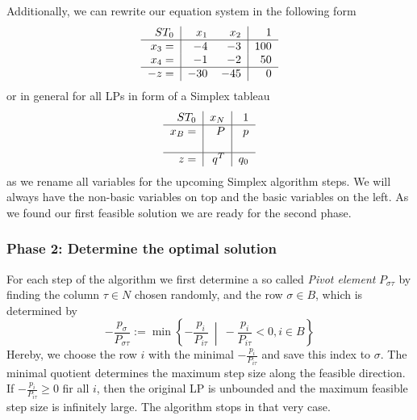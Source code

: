 \documentclass[a4paper, 11pt]{article}
\begin{document}
Additionally, we can rewrite our equation system in the following form
\begin{equation*}
	\begin{tabular}{r|rr|r}
		$ST_0$&$x_1$&$x_2$&$1$\\
		\hline
		$x_3=$&$-4$&$-3$&$100$\\
		$x_4=$&$-1$&$-2$&$50$\\
		\hline
		$-z=$&$-30$&$-45$&$0$
	\end{tabular}
\end{equation*}
or in general for all LPs in form of a Simplex tableau
\begin{equation}
	\begin{tabular}{r|r|r}
		$ST_0$&$x_N$&$1$\\
		\hline
		$x_B=$&$P$&$p$\\
		&&\\
		\hline
		$z=$&$q^T$&$q_0$
	\end{tabular}
\end{equation}
as we rename all variables for the upcoming Simplex algorithm steps. We will always have the non-basic variables on top and the basic variables on the left. As we found our first feasible solution we are ready for the second phase.

\subsubsection{Phase 2: Determine the optimal solution}

For each step of the algorithm we first determine a so called \textit{Pivot element} $P_{\sigma\tau}$ by finding the column $\tau\in N$ chosen randomly, and the row $\sigma\in B$, which is determined by
\begin{equation}
	\label{Pivotsel}
	- \dfrac{p_\sigma}{P_{\sigma\tau}} := \min \left\{ -\frac{p_i}{P_{i\tau}}\ \middle|\ -\frac{p_i}{P_{i\tau}} < 0, i\in B \right\}
\end{equation} 
Hereby, we choose the row $i$ with the minimal $-\frac{p_i}{P_{i\tau}}$ and save this index to $\sigma$. The minimal quotient determines the maximum step size along the feasible direction. If $-\frac{p_i}{P_{i\tau}}\geq 0$ fir all $i$, then the original LP is unbounded and the maximum feasible step size is infinitely large. The algorithm stops in that very case. \\
\end{document}
